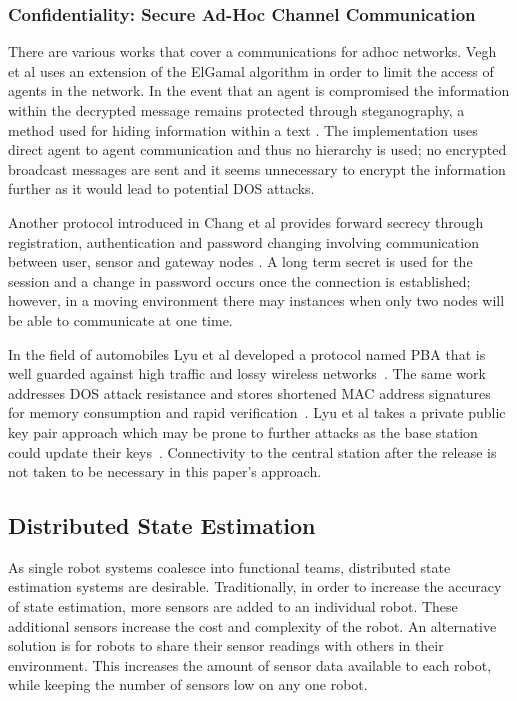 \documentclass[conference]{IEEEtran}
\begin{document}
\subsubsection{Confidentiality: Secure Ad-Hoc Channel Communication}
There are various works that cover a communications for adhoc networks. Vegh et al uses an extension of the ElGamal algorithm in order to limit the access of agents in the network\cite{vegh2014securing}. In the event that an agent is compromised the information within the decrypted message remains protected through steganography, a method used for hiding information within a text \cite{adi2009mechatronic}. The implementation uses direct agent to agent communication and thus no hierarchy is used; no encrypted broadcast messages are sent and it seems unnecessary to encrypt the information further as it would lead to potential DOS attacks.

Another protocol introduced in Chang et al provides forward secrecy through registration, authentication and password changing involving communication between user, sensor and gateway nodes \cite{chang2016provably}. A long term secret is used for the session and a change in password occurs once the connection is established; however, in a moving environment there may instances when only two nodes will be able to communicate at one time.

In the field of automobiles Lyu et al developed a protocol named PBA that is well guarded against high traffic and lossy wireless networks~\cite{lyu2016pba}. The same work addresses DOS attack resistance and stores shortened MAC address signatures for memory consumption and rapid verification~\cite{lyu2016pba}. Lyu et al takes a private public key pair approach which may be prone to further attacks as the base station could update their keys~\cite{lyu2016pba}. Connectivity to the central station after the release is not taken to be necessary in this paper's approach.

\subsection{Distributed State Estimation}
As single robot systems coalesce into functional teams, distributed state estimation systems are desirable. Traditionally, in order to increase the accuracy of state estimation, more sensors are added to an individual robot. These additional sensors increase the cost and complexity of the robot. An alternative solution is for robots to share their sensor readings with others in their environment. This increases the amount of sensor data available to each robot, while keeping the number of sensors low on any one robot.
\end{document}
